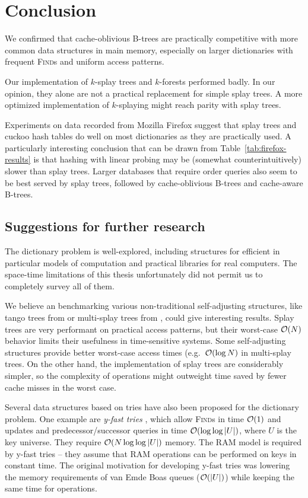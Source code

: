 \chapter*{Conclusion}

We confirmed that cache-oblivious B-trees are practically competitive with
more common data structures in main memory, especially on larger dictionaries
with frequent \textsc{Find}s and uniform access patterns.

Our implementation of $k$-splay trees and $k$-forests performed badly.
In our opinion, they alone are not a practical replacement for simple splay
trees. A more optimized implementation of $k$-splaying might reach parity with
splay trees.

Experiments on data recorded from Mozilla Firefox suggest that splay trees
and cuckoo hash tables do well on most dictionaries as they are practically
used. A particularly interesting conclusion that can be drawn from
Table~\ref{tab:firefox-results} is that hashing with linear probing may
be (somewhat counterintuitively) slower than splay trees.
Larger databases that require order queries also seem to be best served
by splay trees, followed by cache-oblivious \mbox{B-trees} and cache-aware
\mbox{B-trees}.

\section*{Suggestions for further research}
The dictionary problem is well-explored, including structures for efficient
in particular models of computation and practical libraries for real computers.
The space-time limitations of this thesis unfortunately did not permit us to
completely survey all of them.

We believe an benchmarking various non-traditional self-adjusting structures,
like tango trees from \cite{tango} or multi-splay trees from
\cite{multisplay-trees}, could give interesting results. Splay trees are very
performant on practical access patterns, but their worst-case $\mathcal{O}(N)$ behavior
limits their usefulness in time-sensitive systems. Some self-adjusting
structures provide better worst-case access times (e.g.\ $\mathcal{O}(\log N)$ in
multi-splay trees. On the other hand, the implementation of splay trees
are considerably simpler, so the complexity of operations might outweight
time saved by fewer cache misses in the worst case.

Several data structures based on tries have also been proposed for the
dictionary problem. One example are \emph{y-fast tries} \cite{y-fast},
which allow \textsc{Find}s in time $\mathcal{O}(1)$ and updates and predecessor/successor
queries in time $\mathcal{O}(\log\log |U|)$, where $U$ is the key universe. They require
$\mathcal{O}(N \log\log |U|)$ memory.
The RAM model is required by y-fast tries -- they assume that RAM operations
can be performed on keys in constant time.
The original motivation for developing y-fast tries was lowering the memory
requirements of van Emde Boas queues ($\mathcal{O}(|U|)$) while keeping the same time
for operations.

